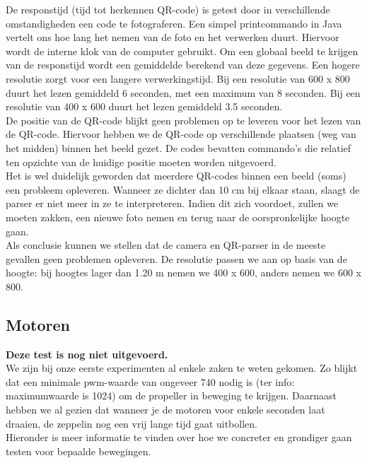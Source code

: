 \documentclass[eind]{penoverslag}
\begin{document}
De responstijd (tijd tot herkennen QR-code) is getest door in verschillende omstandigheden een code te fotograferen. Een simpel printcommando in Java vertelt ons hoe lang het nemen van de foto en het verwerken duurt. Hiervoor wordt de interne klok van de computer gebruikt. Om een globaal beeld te krijgen van de responstijd wordt een gemiddelde berekend van deze gegevens. Een hogere resolutie zorgt voor een langere verwerkingstijd. Bij een resolutie van 600 x 800 duurt het lezen gemiddeld 6 seconden, met een maximum van 8 seconden. Bij een resolutie van 400 x 600 duurt het lezen gemiddeld 3.5 seconden. \\

De positie van de QR-code blijkt geen problemen op te leveren voor het lezen van de QR-code. Hiervoor hebben we de QR-code op verschillende plaatsen (weg van het midden) binnen het beeld gezet. De codes bevatten commando’s die relatief ten opzichte van de huidige positie moeten worden uitgevoerd. \\

Het is wel duidelijk geworden dat meerdere QR-codes binnen een beeld (soms) een probleem opleveren. Wanneer ze dichter dan 10 cm bij elkaar staan, slaagt de parser er niet meer in ze te interpreteren. Indien dit zich voordoet, zullen we moeten zakken, een nieuwe foto nemen en terug naar de oorspronkelijke hoogte gaan. \\

Als conclusie kunnen we stellen dat de camera en QR-parser in de meeste gevallen geen problemen opleveren. De resolutie passen we aan op basis van de hoogte: bij hoogtes lager dan 1.20 m nemen we 400 x 600, anders nemen we 600 x 800. \\


\subsection{Motoren}
\textbf{Deze test is nog niet uitgevoerd.} \\

We zijn bij onze eerste experimenten al enkele zaken te weten gekomen. Zo blijkt dat een minimale pwm-waarde van ongeveer 740 nodig is (ter info: maximumwaarde is 1024) om de propeller in beweging te krijgen. Daarnaast hebben we al gezien dat wanneer je de motoren voor enkele seconden laat draaien, de zeppelin nog een vrij lange tijd gaat uitbollen. \\

Hieronder is meer informatie te vinden over hoe we concreter en grondiger gaan testen voor bepaalde bewegingen. \\
\end{document}
